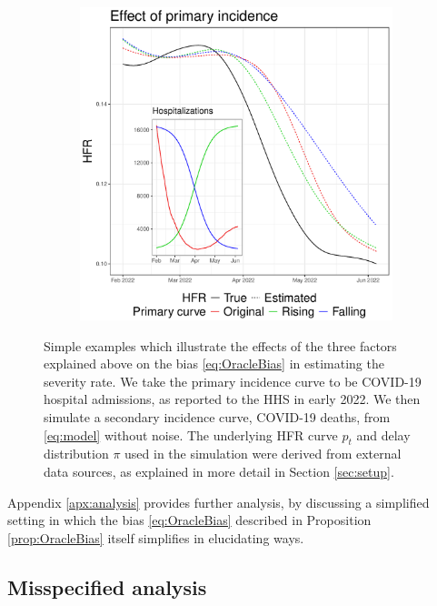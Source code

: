 \documentclass{article}
\begin{document}
\begin{figure}[hb]
\begin{subfigure}[b]{0.32\linewidth}
  \caption{}
  \label{fig:toy_delay}
\end{subfigure}
\begin{subfigure}[b]{0.32\linewidth}
  \centering
  \includegraphics[width=\linewidth]{Figures/Simulated/toy_chging_primary.pdf} 
  \caption{}
  \label{fig:toy_primary}
\end{subfigure}
\caption{Simple examples which illustrate the effects of the three factors
  explained above on the bias \eqref{eq:OracleBias} in estimating the severity
  rate. We take the primary incidence curve to be COVID-19 hospital admissions,
  as reported to the HHS in early 2022. We then simulate a secondary incidence
  curve, COVID-19 deaths, from \eqref{eq:model} without noise. The underlying
  HFR curve $p_t$ and delay distribution $\pi$ used in the simulation were
  derived from external data sources, as explained in more detail in Section
  \ref{sec:setup}.}      
\label{fig:wellspecified}
\end{figure}
      
Appendix \ref{apx:analysis} provides further analysis, by discussing a
simplified setting in which the bias \eqref{eq:OracleBias} described in
Proposition \ref{prop:OracleBias} itself simplifies in elucidating ways.   

\subsection{Misspecified analysis}
\label{sec:misp}
\end{document}
